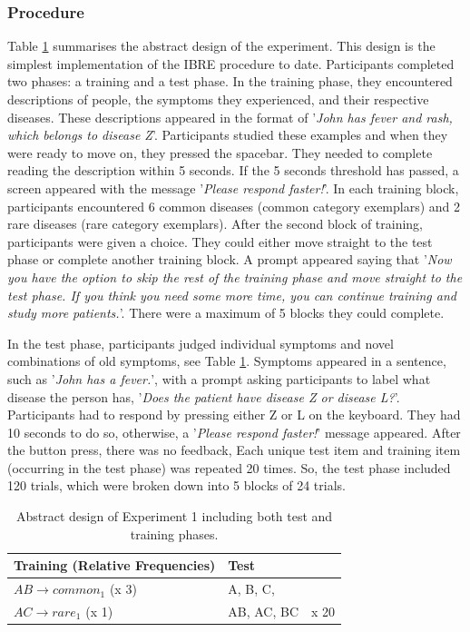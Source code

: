 \documentclass[10pt,letterpaper]{article}
\begin{document}
\subsubsection{Procedure}

Table \ref{tab:abstract-exp1} summarises the abstract design of the experiment.
This design is the simplest implementation of the IBRE procedure to date.
Participants completed two phases: a training and a test phase.
In the training phase, they encountered descriptions of people, the symptoms they experienced, and their respective diseases.
These descriptions appeared in the format of '\textit{John has fever and rash, which belongs to disease Z}'.
Participants studied these examples and when they were ready to move on, they pressed the spacebar.
They needed to complete reading the description within 5 seconds.
If the 5 seconds threshold has passed, a screen appeared with the message '\textit{Please respond faster!}'.
In each training block, participants encountered 6 common diseases (common category exemplars) and 2 rare diseases (rare category exemplars).
After the second block of training, participants were given a choice.
They could either move straight to the test phase or complete another training block.
A prompt appeared saying that '\textit{Now you have the option to skip the rest of the training phase and move straight to the test phase. If you think you need some more time, you can continue training and study more patients.}'.
There were a maximum of 5 blocks they could complete.

In the test phase, participants judged individual symptoms and novel combinations of old symptoms, see Table \ref*{tab:abstract-exp1}.
Symptoms appeared in a sentence, such as '\textit{John has a fever.}', with a prompt asking participants to label what disease the person has, '\textit{Does the patient have disease Z or disease L?}'.
Participants had to respond by pressing either Z or L on the keyboard.
They had 10 seconds to do so, otherwise, a '\textit{Please respond faster!}' message appeared.
After the button press, there was no feedback,
Each unique test item and training item (occurring in the test phase) was repeated 20 times.
So, the test phase included 120 trials, which were broken down into 5 blocks of 24 trials.

\begin{table}[!ht]
  \begin{center}
    \caption{Abstract design of Experiment 1 including both test and training phases. \\}
    \label{tab:abstract-exp1}
    \begin{tabular}{llr} %
      \textbf{Training (Relative Frequencies)} & \textbf{Test}& \\
      \hline
      $AB \to common_{1}$ (x 3) &  A, B, C,         &  \\
      $AC \to rare_{1}$   (x 1) &  AB, AC, BC      & x 20 \\
      \hline
    \end{tabular}
  \end{center}
\end{table}
\end{document}
